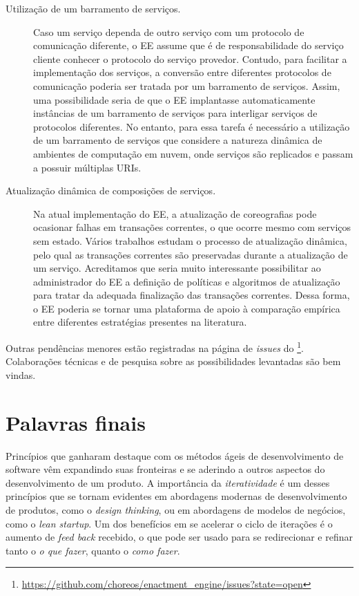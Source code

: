 \begin{description}
\item[Utilização de um barramento de serviços.] Caso um serviço dependa
de outro serviço com um protocolo de comunicação diferente, o EE assume que é de
responsabilidade do serviço cliente conhecer o protocolo do serviço provedor.
Contudo, para facilitar a implementação dos serviços, a conversão entre
diferentes protocolos de comunicação poderia ser tratada por um barramento de serviços.
Assim, uma possibilidade seria de que o EE implantasse automaticamente instâncias
de um barramento de serviços para interligar serviços de protocolos diferentes.
No entanto, para essa tarefa é necessário a utilização de um barramento de serviços
que considere a natureza dinâmica de ambientes de computação em nuvem,
onde serviços são replicados e passam a possuir múltiplas URIs.

\item[Atualização dinâmica de composições de serviços.] Na atual implementação do EE,
a atualização de coreografias pode ocasionar falhas em transações correntes,
o que ocorre mesmo com serviços sem estado.
Vários trabalhos \cite{Kramer1990Philosophers, Vandewoude2007Tranquility, Xiaoxing2011VersionConsistent} 
estudam o processo de atualização dinâmica, pelo qual as transações correntes 
são preservadas durante a atualização de um serviço. 
Acreditamos que seria muito interessante possibilitar ao administrador do EE
a definição de políticas e algoritmos de atualização para 
tratar da adequada finalização das transações correntes.
Dessa forma, o EE poderia se tornar uma plataforma de apoio
à comparação empírica entre diferentes estratégias presentes na literatura.

\end{description}

Outras pendências menores estão registradas na página de \emph{issues} 
do \ee\footnote{\url{https://github.com/choreos/enactment_engine/issues?state=open}}.
Colaborações técnicas e de pesquisa sobre as possibilidades levantadas
são bem vindas.


\section{Palavras finais}

Princípios que ganharam destaque com os métodos ágeis de desenvolvimento
de software vêm expandindo suas fronteiras e se aderindo a outros aspectos
do desenvolvimento de um produto. A importância da \emph{iteratividade}
é um desses princípios que se tornam evidentes em abordagens modernas de
desenvolvimento de produtos, como o \emph{design thinking},
ou em abordagens de modelos de negócios, como o \emph{lean startup}.
Um dos benefícios em se acelerar o ciclo de iterações é o aumento
de \emph{feed back} recebido, o que pode ser usado
para se redirecionar e refinar tanto o \emph{o que fazer}, 
quanto o \emph{como fazer}.

